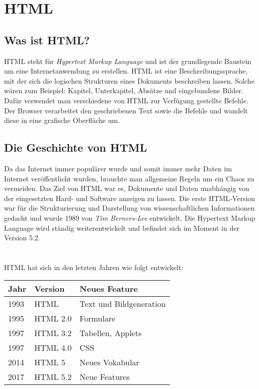 \section{HTML}
\label{html}

\subsection{Was ist HTML?}
HTML steht für \textit{Hypertext Markup Language} und ist der grundlegende Baustein um eine
Internetanwendung zu erstellen. HTML ist eine Beschreibungssprache, mit der sich die logischen
Strukturen eines Dokuments beschreiben lassen. Solche wären zum Beispiel: Kapitel, Unterkapitel,
Absätze und eingebundene Bilder. Dafür verwendet man verschiedene von HTML zur Verfügung gestellte
Befehle. Der Browser verarbeitet den geschriebenen Text sowie die Befehle und wandelt diese in
eine grafische Oberfläche um.

\subsection{Die Geschichte von HTML}
Da das Internet immer populärer wurde und somit immer mehr Daten im Internet veröffentlicht wurden, 
brauchte man allgemeine Regeln um ein Chaos zu vermeiden. Das Ziel von HTML war es, Dokumente und 
Daten unabhängig von der eingesetzten Hard- und Software anzeigen zu lassen. 
Die erste HTML-Version war für die Strukturierung und Darstellung von wissenschaftlichen 
Informationen gedacht und wurde 1989 von \textit{Tim Berners-Lee} entwickelt. Die Hypertext Markup 
Language wird ständig weiterentwickelt und befindet sich im Moment in der Version 5.2. 
~\cite{geschichteHTML}
\\
\\
\\
HTML hat sich in den letzten Jahren wie folgt entwickelt:
\begin{center}
    \begin{table}[]
        \centering
        \begin{tabular}{|l|l|l|} \hline
            {\textbf{Jahr}} & {\textbf{Version}} & {\textbf{Neues Feature}} \\ \hline
            1993                & HTML                   & Text und Bildgeneration      \\ \hline
            1995                & HTML 2.0               & Formulare                    \\ \hline
            1997                & HTML 3.2               & Tabellen, Applets            \\ \hline
            1997                & HTML 4.0               & CSS                          \\ \hline
            2014                & HTML 5                 & Neues Vokabular              \\ \hline
            2017                & HTML 5.2               & Neue Features               \\ \hline
        \end{tabular}
    \end{table}
\end{center}